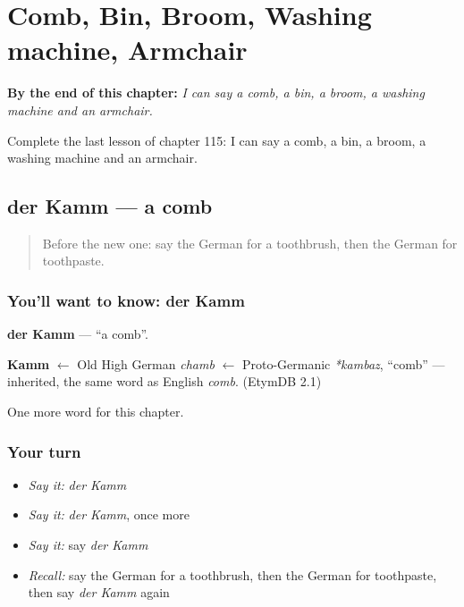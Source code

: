 
\chapter{Comb, Bin, Broom, Washing machine, Armchair}
\label{ch:ge-comb-bin-broom-washing-machine-armchair}

\begin{chapteropening}
\textbf{By the end of this chapter:} \emph{I can say a comb, a bin, a broom, a washing machine and an armchair.}

Complete the last lesson of chapter 115: I can say a comb, a bin, a broom, a washing machine and an armchair.
\end{chapteropening}

\section[der Kamm]{der Kamm — a comb}

\label{lesson:GE-C115-kamm}



\begin{quote}
Before the new one: say the German for a toothbrush, then the German for toothpaste.
\end{quote}

\subsection*{You'll want to know: der Kamm}
\textbf{der Kamm} — \textquotedblleft{}a comb\textquotedblright{}.

\begin{cousinweb}
\textbf{Kamm} $\leftarrow$ Old High German \emph{chamb} $\leftarrow$ Proto-Germanic \emph{*kambaz}, \textquotedblleft{}comb\textquotedblright{} — inherited, the same word as English \emph{comb}. (EtymDB 2.1)
\end{cousinweb}

\begin{grammarlens}[title={What you've built}]
One more word for this chapter.
\end{grammarlens}

\subsection*{Your turn}
\begin{itemize}
\raggedright
  \item \emph{Say it:} \emph{der Kamm}
  \item \emph{Say it:} \emph{der Kamm}, once more
  \item \emph{Say it:} say \emph{der Kamm}
  \item \emph{Recall:} say the German for a toothbrush, then the German for toothpaste, then say \emph{der Kamm} again
\end{itemize}

